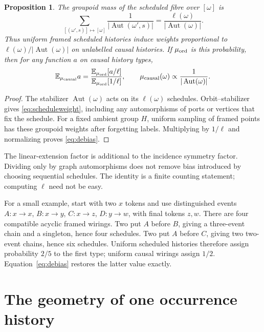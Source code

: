 \documentclass[11pt]{article}
\newtheorem{proposition}[theorem]{Proposition}
\theoremstyle{definition}
\newcommand{\Aut}{\operatorname{Aut}}
\newcommand{\E}{\mathbb E}
\numberwithin{equation}{section}
\begin{document}
\begin{proposition}\label{prop:schedules}
The groupoid mass of the scheduled fibre over $[\omega]$ is
\begin{equation}\label{eq:scheduleweight}
 \sum_{[(\omega',s)]\mapsto[\omega]}
          \frac1{|\Aut(\omega',s)|}
       =\frac{\ell(\omega)}{|\Aut(\omega)|}.
\end{equation}
Thus uniform framed scheduled histories induce weights proportional
to $\ell(\omega)/|\Aut(\omega)|$ on unlabelled causal histories.
If $\mu_{\rm ord}$ is this probability, then for any function $a$
on causal history types,
\begin{equation}\label{eq:debias}
 \E_{\mu_{\rm causal}}a
  =\frac{\E_{\mu_{\rm ord}}[a/\ell]}
         {\E_{\mu_{\rm ord}}[1/\ell]},\qquad
 \mu_{\rm causal}(\omega)\propto\frac1{|\Aut(\omega)|}.
\end{equation}
\end{proposition}
\begin{proof}
The stabilizer $\Aut(\omega)$ acts on its $\ell(\omega)$ schedules.
Orbit--stabilizer gives \eqref{eq:scheduleweight}, including any
automorphisms of ports or vertices that fix the schedule.
For a fixed ambient group $H$, uniform sampling of framed points
has these groupoid weights after forgetting labels.
Multiplying by $1/\ell$ and normalizing proves \eqref{eq:debias}.
\end{proof}

The linear-extension factor is additional to the incidence symmetry
factor. Dividing only by graph automorphisms does not remove bias
introduced by choosing sequential schedules. The identity is a
finite counting statement; computing $\ell$ need not be easy.

For a small example, start with two $x$ tokens and use distinguished
events $A:x\to x$, $B:x\to y$, $C:x\to z$, $D:y\to w$,
with final tokens $z,w$. There are four compatible acyclic framed
wirings. Two put $A$ before $B$, giving a three-event chain and a
singleton, hence four schedules. Two put $A$ before $C$, giving two
two-event chains, hence six schedules. Uniform scheduled histories
therefore assign probability $2/5$ to the first type; uniform
causal wirings assign $1/2$. Equation~\eqref{eq:debias} restores
the latter value exactly.

\section{The geometry of one occurrence history}
\end{document}
